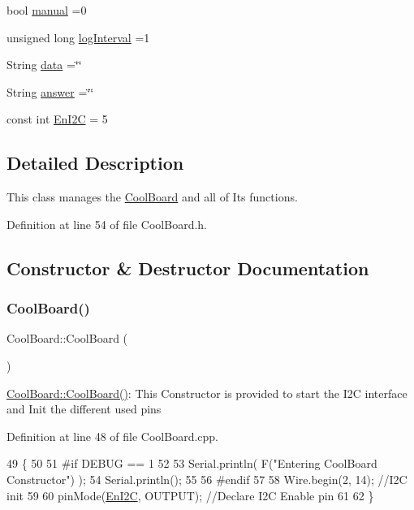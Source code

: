 \begin{DoxyCompactItemize}
\item 
bool \hyperlink{class_cool_board_a7c8e505a5804b109e112d5a03df6ea2b}{manual} =0
\item 
unsigned long \hyperlink{class_cool_board_a84bc94413b64973e4aba8c467c97006c}{log\+Interval} =1
\item 
String \hyperlink{class_cool_board_a427fb753dd8575bdf821c70a5c63d695}{data} =\char`\"{}\char`\"{}
\item 
String \hyperlink{class_cool_board_a7b835fafd449e5282f7f91d787a2dc15}{answer} =\char`\"{}\char`\"{}
\item 
const int \hyperlink{class_cool_board_af1fe1376fc66f93dee80b327ca695377}{En\+I2C} = 5
\end{DoxyCompactItemize}


\subsection{Detailed Description}
This class manages the \hyperlink{class_cool_board}{Cool\+Board} and all of Its functions. 

Definition at line 54 of file Cool\+Board.\+h.



\subsection{Constructor \& Destructor Documentation}
\mbox{\label{class_cool_board_a8b88fd781e22e93025dd63474113b7e4}} 
\subsubsection{\texorpdfstring{Cool\+Board()}{CoolBoard()}}
{\footnotesize\ttfamily Cool\+Board\+::\+Cool\+Board (\begin{DoxyParamCaption}{ }\end{DoxyParamCaption})}

\hyperlink{class_cool_board_a8b88fd781e22e93025dd63474113b7e4}{Cool\+Board\+::\+Cool\+Board()}\+: This Constructor is provided to start the I2C interface and Init the different used pins 

Definition at line 48 of file Cool\+Board.\+cpp.


\begin{DoxyCode}
49 \{
50 
51 \textcolor{preprocessor}{#if DEBUG == 1}
52 
53     Serial.println( F(\textcolor{stringliteral}{"Entering CoolBoard Constructor"}) );
54     Serial.println();
55 
56 \textcolor{preprocessor}{#endif}
57     
58     Wire.begin(2, 14);                       \textcolor{comment}{//I2C init }
59 
60     pinMode(\hyperlink{class_cool_board_af1fe1376fc66f93dee80b327ca695377}{EnI2C}, OUTPUT);           \textcolor{comment}{//Declare I2C Enable pin }
61 
62 \}
\end{DoxyCode}


